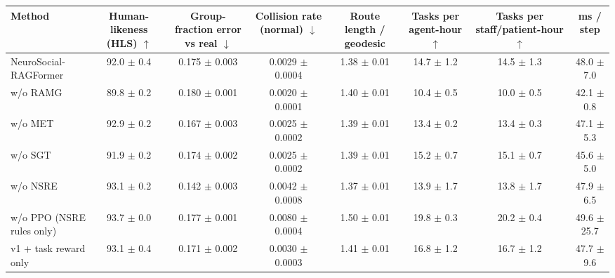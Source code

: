 \begin{tabular}{lccccccc}\toprule
Method & Human-likeness (HLS) $\uparrow$ & Group-fraction error vs real $\downarrow$ & Collision rate (normal) $\downarrow$ & Route length / geodesic & Tasks per agent-hour $\uparrow$ & Tasks per staff/patient-hour $\uparrow$ & ms / step \\ \midrule
NeuroSocial-RAGFormer & 92.0 $\pm$ 0.4 & 0.175 $\pm$ 0.003 & 0.0029 $\pm$ 0.0004 & 1.38 $\pm$ 0.01 & 14.7 $\pm$ 1.2 & 14.5 $\pm$ 1.3 & 48.0 $\pm$ 7.0 \\
w/o RAMG & 89.8 $\pm$ 0.2 & 0.180 $\pm$ 0.001 & 0.0020 $\pm$ 0.0001 & 1.40 $\pm$ 0.01 & 10.4 $\pm$ 0.5 & 10.0 $\pm$ 0.5 & 42.1 $\pm$ 0.8 \\
w/o MET & 92.9 $\pm$ 0.2 & 0.167 $\pm$ 0.003 & 0.0025 $\pm$ 0.0002 & 1.39 $\pm$ 0.01 & 13.4 $\pm$ 0.2 & 13.4 $\pm$ 0.3 & 47.1 $\pm$ 5.3 \\
w/o SGT & 91.9 $\pm$ 0.2 & 0.174 $\pm$ 0.002 & 0.0025 $\pm$ 0.0002 & 1.39 $\pm$ 0.01 & 15.2 $\pm$ 0.7 & 15.1 $\pm$ 0.7 & 45.6 $\pm$ 5.0 \\
w/o NSRE & 93.1 $\pm$ 0.2 & 0.142 $\pm$ 0.003 & 0.0042 $\pm$ 0.0008 & 1.37 $\pm$ 0.01 & 13.9 $\pm$ 1.7 & 13.8 $\pm$ 1.7 & 47.9 $\pm$ 6.5 \\
w/o PPO (NSRE rules only) & 93.7 $\pm$ 0.0 & 0.177 $\pm$ 0.001 & 0.0080 $\pm$ 0.0004 & 1.50 $\pm$ 0.01 & 19.8 $\pm$ 0.3 & 20.2 $\pm$ 0.4 & 49.6 $\pm$ 25.7 \\
v1 + task reward only & 93.1 $\pm$ 0.4 & 0.171 $\pm$ 0.002 & 0.0030 $\pm$ 0.0003 & 1.41 $\pm$ 0.01 & 16.8 $\pm$ 1.2 & 16.7 $\pm$ 1.2 & 47.7 $\pm$ 9.6 \\
\bottomrule\end{tabular}